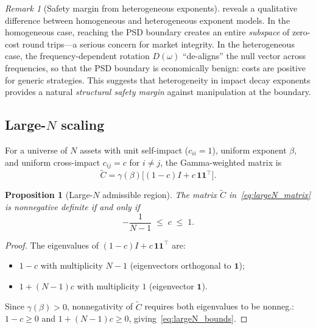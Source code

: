 \documentclass[12pt]{article}
\newtheorem{proposition}[theorem]{Proposition}
\theoremstyle{definition}
\theoremstyle{remark}
\newtheorem{remark}[theorem]{Remark}
\newcommand{\bC}{\widetilde{C}}
\begin{document}
\begin{remark}[Safety margin from heterogeneous exponents]\label{rem:safety_margin}
 reveals a qualitative difference between homogeneous and
heterogeneous exponent models.  In the homogeneous case, reaching the PSD boundary
creates an entire \emph{subspace} of zero-cost round trips---a serious concern for
market integrity.  In the heterogeneous case, the frequency-dependent rotation
$D(\omega)$ ``de-aligns'' the null vector across frequencies, so that the PSD boundary
is economically benign: costs are positive for generic strategies.
This suggests that heterogeneity in impact decay exponents provides a natural
\emph{structural safety margin} against manipulation at the boundary.
\end{remark}


\subsection{Large-\texorpdfstring{$N$}{N} scaling}\label{sec:largeN}

For a universe of $N$ assets with unit self-impact ($c_{ii}=1$), uniform exponent
$\beta$, and uniform cross-impact $c_{ij}=c$ for $i\neq j$, the Gamma-weighted
matrix is
\begin{equation}\label{eq:largeN_matrix}
  \bC = \gamma(\beta)\bigl[(1-c)I + c\,\mathbf{1}\mathbf{1}^\top\bigr].
\end{equation}

\begin{proposition}[Large-$N$ admissible region]\label{prop:largeN}
The matrix $\bC$ in~\eqref{eq:largeN_matrix} is nonnegative definite if and only if
\begin{equation}\label{eq:largeN_bounds}
  -\frac{1}{N-1} \;\le\; c \;\le\; 1.
\end{equation}
\end{proposition}

\begin{proof}
The eigenvalues of $(1-c)I + c\,\mathbf{1}\mathbf{1}^\top$ are:
\begin{itemize}[nosep]
\item $1-c$ with multiplicity $N-1$ (eigenvectors orthogonal to $\mathbf{1}$);
\item $1+(N-1)c$ with multiplicity $1$ (eigenvector $\mathbf{1}$).
\end{itemize}
Since $\gamma(\beta)>0$, nonnegativity of $\bC$ requires both eigenvalues to be
nonneg.: $1-c\ge 0$ and $1+(N-1)c\ge 0$, giving~\eqref{eq:largeN_bounds}.
\end{proof}
\end{document}

